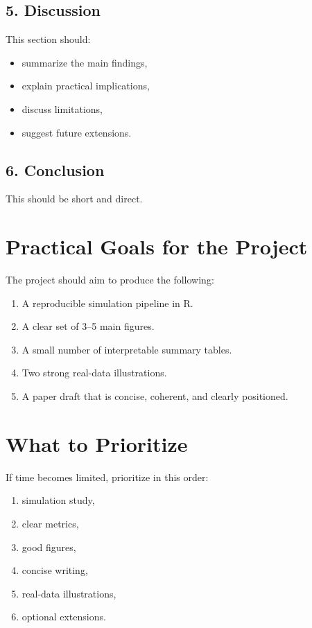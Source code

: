 \documentclass[11pt]{article}
\begin{document}
\subsection*{5. Discussion}
This section should:
\begin{itemize}
    \item summarize the main findings,
    \item explain practical implications,
    \item discuss limitations,
    \item suggest future extensions.
\end{itemize}

\subsection*{6. Conclusion}
This should be short and direct.

\section{Practical Goals for the Project}
The project should aim to produce the following:

\begin{enumerate}[label=\textbf{G\arabic*.}]
    \item A reproducible simulation pipeline in R.
    \item A clear set of 3--5 main figures.
    \item A small number of interpretable summary tables.
    \item Two strong real-data illustrations.
    \item A paper draft that is concise, coherent, and clearly positioned.
\end{enumerate}

\section{What to Prioritize}
If time becomes limited, prioritize in this order:
\begin{enumerate}[label=(\arabic*)]
    \item simulation study,
    \item clear metrics,
    \item good figures,
    \item concise writing,
    \item real-data illustrations,
    \item optional extensions.
\end{enumerate}
\end{document}
